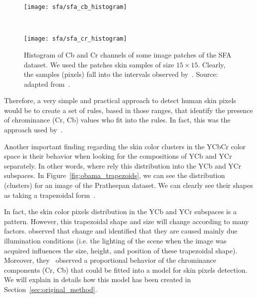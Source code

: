 \begin{figure}[!ht]
    \centering
    \begin{minipage}{0.485\textwidth}
        \texttt{[image: sfa/sfa\_cb\_histogram]}
    \end{minipage}
    ~ %
    \begin{minipage}{0.485\textwidth}
        \texttt{[image: sfa/sfa\_cr\_histogram]}
    \end{minipage}
    \caption[Histogram of Cb and Cr channels of some image patches of the SFA dataset]{Histogram of Cb and Cr channels of some image patches of the SFA dataset. We used the patches skin samples of size $15 \times 15$. Clearly, the samples (pixels) fall into the intervals observed by~\citet{chai:99}. Source: adapted from~\citet{chai:99}.}
    \label{fig:dataset_sfa_ycbcr_hist}
\end{figure}

Therefore, a very simple and practical approach to detect human skin pixels would be to create a set of rules, based in those ranges, that identify the presence of chrominance (Cr, Cb) values who fit into the rules. In fact, this was the approach used by~\citet{chai:99}.

Another important finding regarding the skin color clusters in the YCbCr color space is their behavior when looking for the compositions of YCb and YCr separately. In other words, where rely this distribution into the YCb and YCr subspaces. In Figure~\ref{fig:obama_trapezoids}, we can see the distribution (clusters) for an image of the Pratheepan dataset. We can clearly see their shapes as taking a trapezoidal form~\citep{hsu:02}.

In fact, the skin color pixels distribution in the YCb and YCr subspaces is a pattern. However, this trapezoidal shape and size will change according to many factors. \citet{brancati:17} observed that change and identified that they are caused mainly due illumination conditions (i.e. the lighting of the scene when the image was acquired influences the size, height, and position of these trapezoidal shape). Moreover, they~\citep{brancati:17} observed a proportional behavior of the chrominance components (Cr, Cb) that could be fitted into a model for skin pixels detection. We will explain in details how this model has been created in Section~\ref{sec:original_method}.

